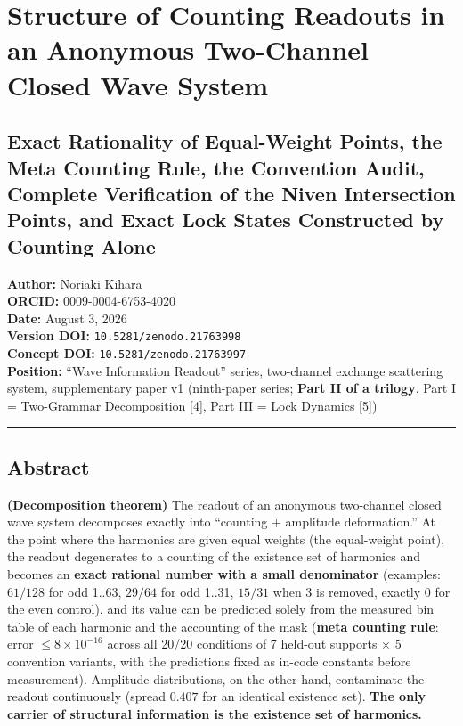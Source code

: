 \documentclass[
  a4paper,
]{article}
\author{}
\date{}
\begin{document}
\section{Structure of Counting Readouts in an Anonymous Two-Channel
Closed Wave
System}\label{structure-of-counting-readouts-in-an-anonymous-two-channel-closed-wave-system}

\subsection{Exact Rationality of Equal-Weight Points, the Meta Counting
Rule, the Convention Audit, Complete Verification of the Niven
Intersection Points, and Exact Lock States Constructed by Counting
Alone}\label{exact-rationality-of-equal-weight-points-the-meta-counting-rule-the-convention-audit-complete-verification-of-the-niven-intersection-points-and-exact-lock-states-constructed-by-counting-alone}

\textbf{Author:} Noriaki Kihara\\
\textbf{ORCID:} 0009-0004-6753-4020\\
\textbf{Date:} August 3, 2026\\
\textbf{Version DOI:} \texttt{10.5281/zenodo.21763998}\\
\textbf{Concept DOI:} \texttt{10.5281/zenodo.21763997}\\
\textbf{Position:} ``Wave Information Readout'' series, two-channel
exchange scattering system, supplementary paper v1 (ninth-paper series;
\textbf{Part II of a trilogy}. Part I = Two-Grammar Decomposition
{[}4{]}, Part III = Lock Dynamics {[}5{]})

\begin{center}\rule{0.5\linewidth}{0.5pt}\end{center}

\subsection{Abstract}\label{abstract}

\textbf{(Decomposition theorem)} The readout of an anonymous two-channel
closed wave system decomposes exactly into ``counting + amplitude
deformation.'' At the point where the harmonics are given equal weights
(the equal-weight point), the readout degenerates to a counting of the
existence set of harmonics and becomes an \textbf{exact rational number
with a small denominator} (examples: \(61/128\) for odd 1..63, \(29/64\)
for odd 1..31, \(15/31\) when 3 is removed, exactly \(0\) for the even
control), and its value can be predicted solely from the measured bin
table of each harmonic and the accounting of the mask (\textbf{meta
counting rule}: error \(\le8\times10^{-16}\) across all 20/20 conditions
of 7 held-out supports × 5 convention variants, with the predictions
fixed as in-code constants before measurement). Amplitude distributions,
on the other hand, contaminate the readout continuously (spread
\(0.407\) for an identical existence set). \textbf{The only carrier of
structural information is the existence set of harmonics.}
\end{document}
